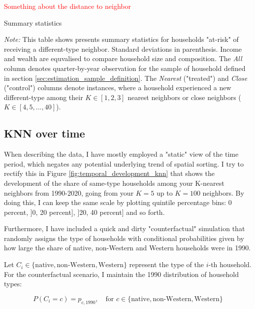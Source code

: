 \documentclass[main.tex]{subfiles}
\begin{document}
\textcolor{red}{Something about the distance to neighbor}

\begin{table}[H]
    \centering
    \caption{Summary statistics}
    \resizebox{\textwidth}{!}{}
    \label{tab:descriptives_native_and_non_west}
\begin{tablenotes}[flushleft]
\item \scriptsize \textit{Note:} This table shows presents summary statistics for households "at-risk" of receiving a different-type neighbor. Standard deviations in parenthesis. Income and wealth are equvalised to compare household size and composition. The \textit{All} column denotes quarter-by-year observation for the sample of household defined in section \ref{sec:estimation_sample_definition}. The \textit{Nearest} ("treated") and \textit{Close} ("control") columns denote instances, where a household experienced a new different-type among their $K\in [1,2,3]$ nearest neighbors or close neighbors ($K\in [4, 5, ...,40]$).
\end{tablenotes}
\end{table}

\subsection{KNN over time}
When describing the data, I have mostly employed a "static" view of the time period, which negates any potential underlying trend of spatial sorting. I try to rectify this in Figure \ref{fig:temporal_development_knn} that shows the development of the share of same-type households among your K-nearest neighbors from 1990-2020, going from your $K=5$ up to $K=100$ neighbors. By doing this, I can keep the same scale by plotting quintile percentage bins: 0 percent, ]0, 20 percent], ]20, 40 percent] and so forth. 

Furthermore, I have included a quick and dirty "counterfactual" simulation that randomly assigns the type of households with conditional probabilities given by how large the share of native, non-Western and Western households were in 1990.

Let $C_i \in \{\text{native}, \text{non-Western}, \text{Western}\}$ represent the type of the $i$-th household. For the counterfactual scenario, I maintain the 1990 distribution of household types:

$$P(C_i = c) = p_{c,1990}, \quad \text{for } c \in \{\text{native}, \text{non-Western}, \text{Western}\}$$
\end{document}
